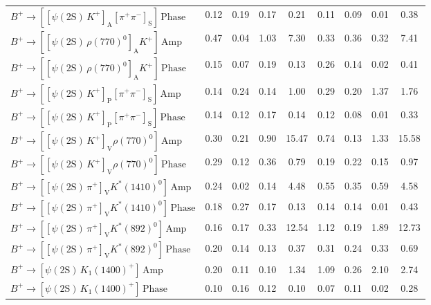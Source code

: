 \begin{tabular}{l  c  c  c  c  c  c  c  | c }
$B^{+}\rightarrow \left[\left[\psi(\text{2S})\,K^{+}\right]_{\text{A}}\left[\pi^{+}\pi^{-}\right]_{\text{S}}\right]\,\text{Phase}$ & 0.12 & 0.19 & 0.17 & 0.21 & 0.11 & 0.09 & 0.01 & 0.38 \\ 
$B^{+}\rightarrow \left[\left[\psi(\text{2S})\,\rho(770)^{0}\right]_{\text{A}}K^{+}\right]\,\text{Amp}$ & 0.47 & 0.04 & 1.03 & 7.30 & 0.33 & 0.36 & 0.32 & 7.41 \\ 
$B^{+}\rightarrow \left[\left[\psi(\text{2S})\,\rho(770)^{0}\right]_{\text{A}}K^{+}\right]\,\text{Phase}$ & 0.15 & 0.07 & 0.19 & 0.13 & 0.26 & 0.14 & 0.02 & 0.41 \\ 
$B^{+}\rightarrow \left[\left[\psi(\text{2S})\,K^{+}\right]_{\text{P}}\left[\pi^{+}\pi^{-}\right]_{\text{S}}\right]\,\text{Amp}$ & 0.14 & 0.24 & 0.14 & 1.00 & 0.29 & 0.20 & 1.37 & 1.76 \\ 
$B^{+}\rightarrow \left[\left[\psi(\text{2S})\,K^{+}\right]_{\text{P}}\left[\pi^{+}\pi^{-}\right]_{\text{S}}\right]\,\text{Phase}$ & 0.14 & 0.12 & 0.17 & 0.14 & 0.12 & 0.08 & 0.01 & 0.33 \\ 
$B^{+}\rightarrow \left[\left[\psi(\text{2S})\,K^{+}\right]_{\text{V}}\rho(770)^{0}\right]\,\text{Amp}$ & 0.30 & 0.21 & 0.90 & 15.47 & 0.74 & 0.13 & 1.33 & 15.58 \\ 
$B^{+}\rightarrow \left[\left[\psi(\text{2S})\,K^{+}\right]_{\text{V}}\rho(770)^{0}\right]\,\text{Phase}$ & 0.29 & 0.12 & 0.36 & 0.79 & 0.19 & 0.22 & 0.15 & 0.97 \\ 
$B^{+}\rightarrow \left[\left[\psi(\text{2S})\,\pi^{+}\right]_{\text{V}}K^{*}(1410)^{0}\right]\,\text{Amp}$ & 0.24 & 0.02 & 0.14 & 4.48 & 0.55 & 0.35 & 0.59 & 4.58 \\ 
$B^{+}\rightarrow \left[\left[\psi(\text{2S})\,\pi^{+}\right]_{\text{V}}K^{*}(1410)^{0}\right]\,\text{Phase}$ & 0.18 & 0.27 & 0.17 & 0.13 & 0.14 & 0.14 & 0.01 & 0.43 \\ 
$B^{+}\rightarrow \left[\left[\psi(\text{2S})\,\pi^{+}\right]_{\text{V}}K^{*}(892)^{0}\right]\,\text{Amp}$ & 0.16 & 0.17 & 0.33 & 12.54 & 1.12 & 0.19 & 1.89 & 12.73 \\ 
$B^{+}\rightarrow \left[\left[\psi(\text{2S})\,\pi^{+}\right]_{\text{V}}K^{*}(892)^{0}\right]\,\text{Phase}$ & 0.20 & 0.14 & 0.13 & 0.37 & 0.31 & 0.24 & 0.33 & 0.69 \\ 
$B^{+}\rightarrow \left[\psi(\text{2S})\,K_{1}(1400)^{+}\right]\,\text{Amp}$ & 0.20 & 0.11 & 0.10 & 1.34 & 1.09 & 0.26 & 2.10 & 2.74 \\ 
$B^{+}\rightarrow \left[\psi(\text{2S})\,K_{1}(1400)^{+}\right]\,\text{Phase}$ & 0.10 & 0.16 & 0.12 & 0.10 & 0.07 & 0.11 & 0.02 & 0.28 \\ 

\end{tabular}
